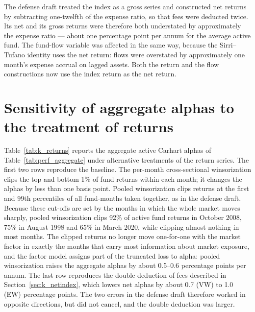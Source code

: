 \documentclass[12pt, oneside]{report}
\begin{document}
The defense draft treated the index as a gross series and constructed
net returns by subtracting one-twelfth of the expense ratio, so that fees
were deducted twice. Its net and its gross returns were therefore both
understated by approximately the expense ratio --- about
one percentage point per annum for the average active fund. The fund-flow
variable was affected in the same way, because the Sirri--Tufano identity
uses the net return: flows were overstated by approximately one month's
expense accrual on lagged assets. Both the return and the flow
constructions now use the index return as the net return.

\section{Sensitivity of aggregate alphas to the treatment of returns}
\label{sec:k_returns}

\noindent Table~\ref{tab:k_returns} reports the aggregate active
Carhart alphas of Table~\ref{tab:perf_aggregate} under alternative
treatments of the return series. The first two rows reproduce the
baseline. The per-month cross-sectional winsorization clips the top and
bottom 1\% of fund returns within each month; it changes the alphas by
less than one basis point. Pooled winsorization clips returns at the
first and 99th percentiles of all fund-months taken together, as in the
defense draft. Because these cut-offs are set by the months in which the
whole market moves sharply, pooled winsorization clips 92\% of active fund
returns in October 2008, 75\% in August 1998 and 65\% in March 2020, while
clipping almost nothing in most months. The clipped
returns no longer move one-for-one with the market factor in exactly the
months that carry most information about market exposure, and the factor
model assigns part of the truncated loss to alpha: pooled winsorization
raises the aggregate alphas by about 0.5--0.6 percentage points per
annum. The last row reproduces the double deduction of fees described in
Section~\ref{sec:k_netindex}, which lowers net alphas by about 0.7
(VW) to 1.0 (EW) percentage points. The two errors in the defense draft therefore worked in
opposite directions, but did not cancel, and the double deduction was larger.
\end{document}
